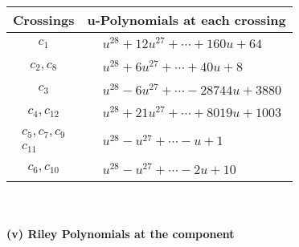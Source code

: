 \documentclass[1p]{elsarticle_modified}
\theoremstyle{definition}
\begin{document}
\begin{tabular}{m{50pt}|m{274pt}}
Crossings & \hspace{64pt}u-Polynomials at each crossing \\
\hline $$\begin{aligned}c_{1}\end{aligned}$$&$\begin{aligned}
&u^{28}+12 u^{27}+\cdots+160 u+64
\end{aligned}$\\
\hline $$\begin{aligned}c_{2},c_{8}\end{aligned}$$&$\begin{aligned}
&u^{28}+6 u^{27}+\cdots+40 u+8
\end{aligned}$\\
\hline $$\begin{aligned}c_{3}\end{aligned}$$&$\begin{aligned}
&u^{28}-6 u^{27}+\cdots-28744 u+3880
\end{aligned}$\\
\hline $$\begin{aligned}c_{4},c_{12}\end{aligned}$$&$\begin{aligned}
&u^{28}+21 u^{27}+\cdots+8019 u+1003
\end{aligned}$\\
\hline $$\begin{aligned}c_{5},c_{7},c_{9}\\c_{11}\end{aligned}$$&$\begin{aligned}
&u^{28}- u^{27}+\cdots- u+1
\end{aligned}$\\
\hline $$\begin{aligned}c_{6},c_{10}\end{aligned}$$&$\begin{aligned}
&u^{28}- u^{27}+\cdots-2 u+10
\end{aligned}$\\
\hline
\end{tabular}\\~\\
\newpage\renewcommand{\arraystretch}{1}
\flushleft \textbf{(v) Riley Polynomials at the component}\newline \\
\end{document}
